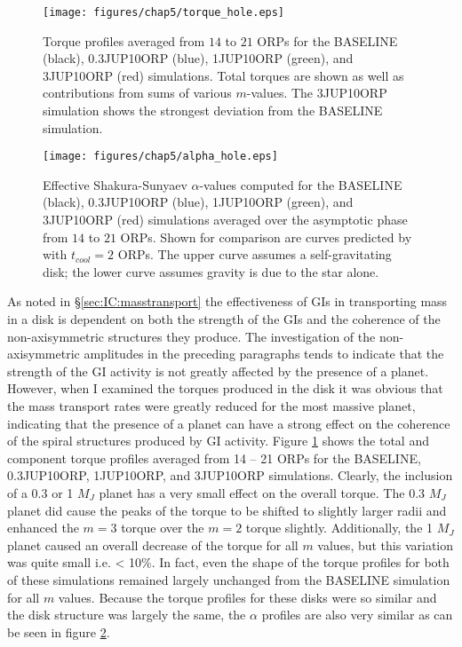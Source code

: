 \begin{figure}[p]
\centering
\texttt{[image: figures/chap5/torque\_hole.eps]}
\caption[NEED TAGLINE]{Torque profiles averaged from $14$ to $21$ ORPs for the BASELINE (black), 0.3JUP10ORP (blue), 1JUP10ORP (green), and 3JUP10ORP (red) simulations. Total torques are shown as well as contributions from sums of various $m$-values. The 3JUP10ORP simulation shows the strongest deviation from the BASELINE simulation.}
\label{fig:PL:torquehole}
\end{figure}

\begin{figure}[p]
\centering
\texttt{[image: figures/chap5/alpha\_hole.eps]}
\caption[NEED TAGLINE]{Effective Shakura-Sunyaev $\alpha$-values computed for the BASELINE (black), 0.3JUP10ORP (blue), 1JUP10ORP (green), and 3JUP10ORP (red) simulations averaged over the asymptotic phase from $14$ to $21$ ORPs. Shown for comparison are curves predicted by \citeauthor{gammie2001} with $t_{cool} = 2$ ORPs. The upper curve assumes a self-gravitating disk; the lower curve assumes gravity is due to the star alone.}
\label{fig:PL:alphahole}
\end{figure}

As noted in \S\ref{sec:IC:masstransport} the effectiveness of GIs in transporting mass in a disk is dependent on both the strength of the GIs and the coherence of the non-axisymmetric structures they produce. The investigation of the non-axisymmetric amplitudes in the preceding paragraphs tends to indicate that the strength of the GI activity is not greatly affected by the presence of a planet. However, when I examined the torques produced in the disk it was obvious that the mass transport rates were greatly reduced for the most massive planet, indicating that the presence of a planet can have a strong effect on the coherence of the spiral structures produced by GI activity. Figure \ref{fig:PL:torquehole} shows the total and component torque profiles averaged from 14 -- 21 ORPs for the BASELINE, 0.3JUP10ORP, 1JUP10ORP, and 3JUP10ORP simulations. Clearly, the inclusion of a 0.3 or 1 $M_J$ planet has a very small effect on the overall torque. The 0.3 $M_J$ planet did cause the peaks of the torque to be shifted to slightly larger radii and enhanced the $m = 3$ torque over the $m = 2$ torque slightly. Additionally, the 1 $M_J$ planet caused an overall decrease of the torque for all $m$ values, but this variation was quite small i.e. < 10\%. In fact, even the shape of the torque profiles for both of these simulations remained largely unchanged from the BASELINE simulation for all $m$ values. Because the torque profiles for these disks were so similar and the disk structure was largely the same, the $\alpha$ profiles are also very similar as can be seen in figure \ref{fig:PL:alphahole}.

